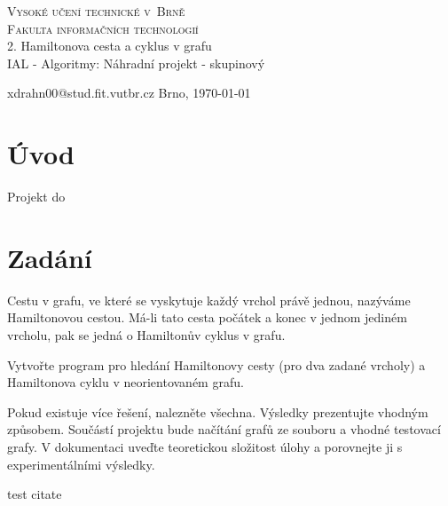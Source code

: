 \documentclass[a4paper,11pt]{article}
\begin{document}
\begin{titlepage}

	\begin{center}
		{\Huge\textsc{Vysoké učení technické v~Brně}}\\
		\medskip
		{\huge\textsc{Fakulta informačních technologií}}\\
		{\huge 2. Hamiltonova cesta a cyklus v grafu}\\
		\medskip
		{\LARGE IAL - Algoritmy: Náhradní projekt - skupinový}\\
	\end{center}

    \noindent xdrahn00@stud.fit.vutbr.cz \Large {\hfill Brno, \today}

\end{titlepage}

\section{Úvod}

Projekt do

\section{Zadání}

Cestu v grafu, ve které se vyskytuje každý vrchol právě jednou, nazýváme Hamiltonovou cestou. Má-li tato cesta počátek a konec v jednom jediném vrcholu, pak se jedná o Hamiltonův cyklus v grafu. 

Vytvořte program pro hledání Hamiltonovy cesty (pro dva zadané vrcholy) a Hamiltonova cyklu v neorientovaném grafu. 

Pokud existuje více řešení, nalezněte všechna. Výsledky prezentujte vhodným způsobem. Součástí projektu bude načítání grafů ze souboru a vhodné testovací grafy. V dokumentaci uveďte teoretickou složitost úlohy a porovnejte ji s experimentálními výsledky.

test citate \cite{test_citate}


\begin{figure}[h!]
\centering
{}
\end{figure}

\newpage




\end{document}
